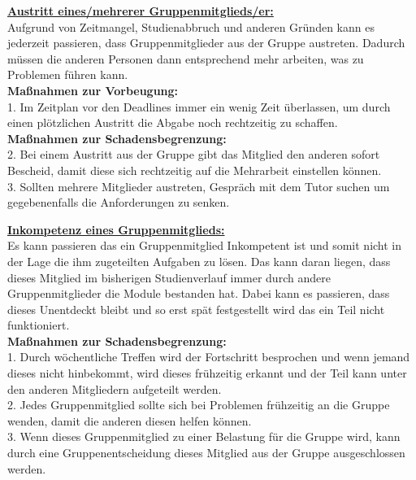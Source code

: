 \documentclass[fontsize=12pt,paper=a4,twoside]{scrartcl}
\begin{document}
\bigskip 

\textbf{\underline{Austritt eines/mehrerer Gruppenmitglieds/er:}}\\
Aufgrund von Zeitmangel, Studienabbruch und anderen Gründen kann es jederzeit passieren, dass Gruppenmitglieder aus der Gruppe austreten. Dadurch müssen die anderen Personen dann entsprechend mehr arbeiten, was zu Problemen führen kann.\\
\textbf{Maßnahmen zur Vorbeugung:}\\
1. Im Zeitplan vor den Deadlines immer ein wenig Zeit überlassen, um durch einen plötzlichen Austritt die Abgabe noch rechtzeitig zu schaffen.\\
\textbf{Maßnahmen zur Schadensbegrenzung:}\\
2. Bei einem Austritt aus der Gruppe gibt das Mitglied den anderen sofort Bescheid, damit diese sich rechtzeitig auf die Mehrarbeit einstellen können.\\
3. Sollten mehrere Mitglieder austreten, Gespräch mit dem Tutor suchen um gegebenenfalls die Anforderungen zu senken.\\

\bigskip 

\textbf{\underline{Inkompetenz eines Gruppenmitglieds:}}\\
Es kann passieren das ein Gruppenmitglied Inkompetent ist und somit nicht in der Lage die ihm zugeteilten Aufgaben zu lösen. Das kann daran liegen, dass dieses Mitglied im bisherigen Studienverlauf immer durch andere Gruppenmitglieder die Module bestanden hat. Dabei kann es passieren, dass dieses Unentdeckt bleibt und so erst spät festgestellt wird das ein Teil nicht funktioniert.\\
\textbf{Maßnahmen zur Schadensbegrenzung:}\\
1. Durch wöchentliche Treffen wird der Fortschritt besprochen und wenn jemand dieses nicht hinbekommt, wird dieses frühzeitig erkannt und der Teil kann unter den anderen Mitgliedern aufgeteilt werden.\\
2. Jedes Gruppenmitglied sollte sich bei Problemen frühzeitig an die Gruppe wenden, damit die anderen diesen helfen können. \\
3. Wenn dieses Gruppenmitglied zu einer Belastung für die Gruppe wird, kann durch eine Gruppenentscheidung dieses Mitglied aus der Gruppe ausgeschlossen werden. \\

\bigskip
\end{document}
